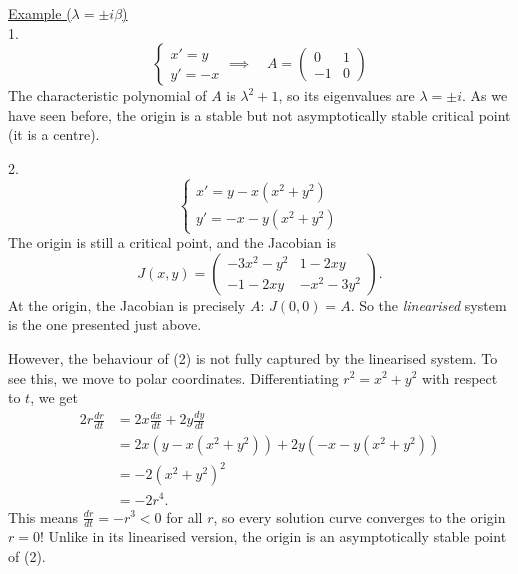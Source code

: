 \documentclass[11pt, letterpaper, oneside]{article}     %
\numberwithin{equation}{subsection}
\theoremstyle{definition}
\numberwithin{theorem}{section}
\theoremstyle{remark}
\newcommand{\ds}{\displaystyle}
\begin{document}
\begin{enumerate}
  \underline{Example ($\lambda = \pm i\beta$)}\\
  1.
  \begin{equation}
    \begin{cases}
      x' = y\\
      y' = -x
    \end{cases}
    \implies\quad
    A =
    \begin{pmatrix}
      0 & 1\\
      -1 & 0
    \end{pmatrix}
  \end{equation}
  The characteristic polynomial of $A$ is $\lambda^2 + 1$, so its eigenvalues are $\lambda = \pm i$. As we have seen before, the origin is a stable but not asymptotically stable critical point (it is a centre).

  2.
  \begin{equation}
    \begin{cases}
      x' = y - x(x^2 + y^2)\\
      y' = -x - y(x^2 + y^2)
    \end{cases}
  \end{equation}
  The origin is still a critical point, and the Jacobian is
  \begin{equation}
    J(x,y) =
    \begin{pmatrix}
      -3x^2 - y^2 & 1 - 2xy\\
      -1-2xy & -x^2-3y^2
    \end{pmatrix}.
  \end{equation}
  At the origin, the Jacobian is precisely $A$: $J(0,0)  = A$. So the \emph{linearised} system is the one presented just above.

  However, the behaviour of (2) is not fully captured by the linearised system. To see this, we move to polar coordinates. Differentiating $r^2 = x^2 + y^2$ with respect to $t$, we get
  \begin{equation}
    \begin{split}
      2r\frac{dr}{dt} &= 2x\frac{dx}{dt} + 2y\frac{dy}{dt}\\
      &= 2x(y - x(x^2+y^2)) + 2y(-x-y(x^2+y^2))\\
      &= -2(x^2+y^2)^2\\
      &= -2r^4.
    \end{split}
  \end{equation}
  This means $\ds\frac{dr}{dt} = -r^3 < 0$ for all $r$, so every solution curve converges to the origin $r=0$! Unlike in its linearised version, the origin is an asymptotically stable point of (2).


\end{enumerate}
\end{document}
